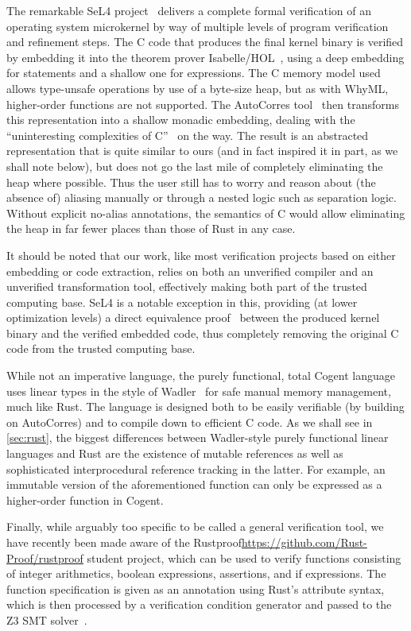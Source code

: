 The remarkable SeL4 project~\cite{klein2009sel4} delivers a complete formal verification of an operating
system microkernel by way of multiple levels of program verification and
refinement steps. The C code that produces the final kernel binary is verified
by embedding it into the theorem prover
Isabelle/HOL~\cite{nipkow2002isabelle}, using a deep embedding for statements
and a shallow one for expressions. The C memory model used allows type-unsafe
operations by use of a byte-size heap, but as with WhyML, higher-order functions are
not supported. The AutoCorres tool~\cite{greenaway2012bridging, greenaway2014don}
then transforms this representation into a shallow monadic embedding,
dealing with the ``uninteresting complexities of C''~\cite{greenaway2014don} on the
way. The result is an abstracted representation that is quite similar to ours
(and in fact inspired it in part, as we shall note below), but does not go the
last mile of completely eliminating the heap where possible. Thus the user still
has to worry and reason about (the absence of) aliasing manually or through a
nested logic such as separation logic. Without explicit
no-alias annotations, the semantics of C would allow eliminating the heap in far fewer places than those
of Rust in any case.

It should be noted that our work, like most verification projects based on
either embedding or code extraction, relies on both
an unverified compiler and an unverified transformation tool, effectively making both
part of the trusted computing base. SeL4 is a notable exception in this,
providing (at lower optimization levels) a direct equivalence proof~\cite{sewell2013translation} between the
produced kernel binary and the verified embedded code, thus completely removing
the original C code from the trusted computing base.

While not an imperative language, the purely functional, total Cogent language~\cite{o2016refinement}
uses linear types in the style of Wadler~\cite{wadler1990linear} for safe
manual memory management, much like Rust. The language is designed both to be
easily verifiable (by building on AutoCorres) and to
compile down to efficient C code. As we shall see in \autoref{sec:rust}, the
biggest differences between Wadler-style purely functional linear languages and Rust are the
existence of mutable references as well as sophisticated interprocedural
reference tracking in the latter. For example, an immutable version of the aforementioned 
function can only be expressed as a higher-order function in Cogent.

Finally, while arguably too specific to be called a general verification tool,
we have recently been made aware of the
Rustproof\url{https://github.com/Rust-Proof/rustproof} student project, which
can be used to verify functions consisting of integer arithmetics, boolean
expressions, assertions, and if expressions. The function specification is given
as an annotation using Rust's attribute syntax, which is then processed by a
verification condition generator and passed to the Z3 SMT solver~\cite{de2008z3}.